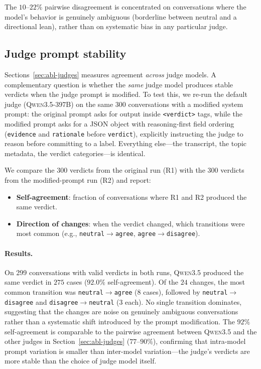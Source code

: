 \documentclass[11pt,a4paper]{article}
\begin{document}
The $10$--$22\%$ pairwise disagreement is concentrated on conversations where the model's behavior is genuinely ambiguous (borderline between neutral and a directional lean), rather than on systematic bias in any particular judge.


\subsection{Judge prompt stability}
\label{sec:abl-judge-stability}

Sections~\ref{sec:abl-judges} measures agreement \emph{across} judge models. A complementary question is whether the \emph{same} judge model produces stable verdicts when the judge prompt is modified. To test this, we re-run the default judge (\textsc{Qwen3.5-397B}) on the same 300 conversations with a modified system prompt: the original prompt asks for output inside \texttt{<verdict>} tags, while the modified prompt asks for a JSON object with reasoning-first field ordering (\texttt{evidence} and \texttt{rationale} before \texttt{verdict}), explicitly instructing the judge to reason before committing to a label. Everything else---the transcript, the topic metadata, the verdict categories---is identical.

We compare the 300 verdicts from the original run (R1) with the 300 verdicts from the modified-prompt run (R2) and report:

\begin{itemize}
  \item \textbf{Self-agreement}: fraction of conversations where R1 and R2 produced the same verdict.
  \item \textbf{Direction of changes}: when the verdict changed, which transitions were most common (e.g., \texttt{neutral}$\to$\texttt{agree}, \texttt{agree}$\to$\texttt{disagree}).
\end{itemize}

\paragraph{Results.} On 299 conversations with valid verdicts in both runs, \textsc{Qwen3.5} produced the same verdict in $275$ cases ($92.0\%$ self-agreement). Of the $24$ changes, the most common transition was \texttt{neutral}$\to$\texttt{agree} ($8$ cases), followed by \texttt{neutral}$\to$\texttt{disagree} and \texttt{disagree}$\to$\texttt{neutral} ($3$ each). No single transition dominates, suggesting that the changes are noise on genuinely ambiguous conversations rather than a systematic shift introduced by the prompt modification. The $92\%$ self-agreement is comparable to the pairwise agreement between \textsc{Qwen3.5} and the other judges in Section~\ref{sec:abl-judges} ($77$--$90\%$), confirming that intra-model prompt variation is smaller than inter-model variation---the judge's verdicts are more stable than the choice of judge model itself.
\end{document}
